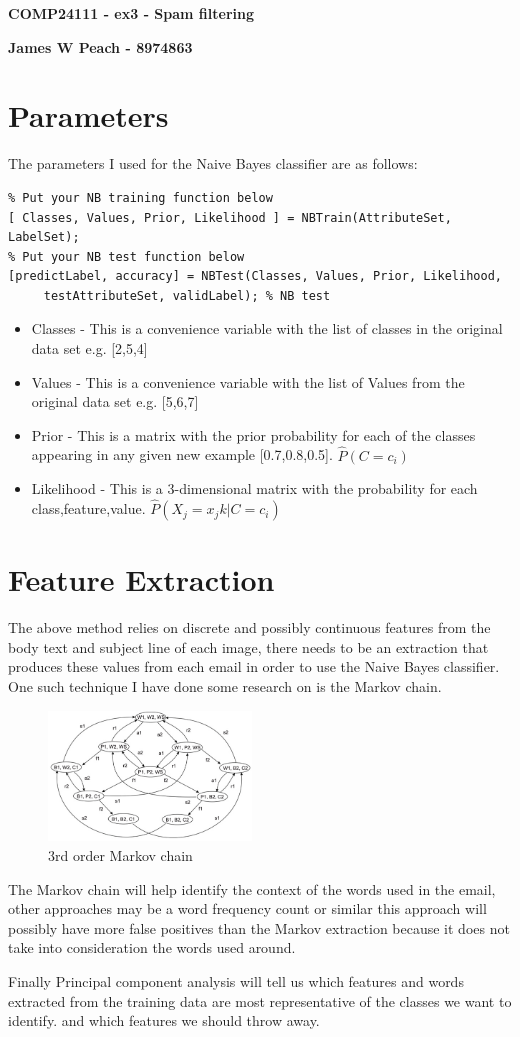 \documentclass[a4paper]{article}
\begin{document}
\textbf{COMP24111 - ex3 - Spam filtering}

\textbf{James W Peach - 8974863}

\section{Parameters}


The parameters I used for the Naive Bayes classifier are as follows:

{\centering\begin{lstlisting}
% Put your NB training function below
[ Classes, Values, Prior, Likelihood ] = NBTrain(AttributeSet, LabelSet);
% Put your NB test function below
[predictLabel, accuracy] = NBTest(Classes, Values, Prior, Likelihood,
	 testAttributeSet, validLabel); % NB test
\end{lstlisting}\par}

\begin{itemize}
\item Classes - This is a convenience variable with the list of classes in the original data set e.g. [2,5,4]
\item Values - This is a convenience variable with the list of Values from the original data set e.g. [5,6,7] 
\item Prior - This is a matrix with the prior probability for each of the classes appearing in any given new example [0.7,0.8,0.5]. $\hat{P}(C=c_i)$
\item Likelihood - This is a 3-dimensional matrix with the probability for each class,feature,value.  $\hat{P}(X_{j} = x_jk | C = c_i)$
\end{itemize}
\section{Feature Extraction}

The above method relies on discrete and possibly continuous features from the body text and subject line of each image, there needs to be an extraction that produces these values from each email in order to use the Naive Bayes classifier.
One such technique I have done some research on is the Markov chain. 
\begin{figure}[h]
\begin{center}
  \includegraphics[width=0.48\textwidth]{order-3-markov.jpg}
  \caption{3rd order Markov chain}
\end{center}
\end{figure}
The Markov chain will help identify the context of the words used in the email, other approaches may be a word frequency count or similar this approach will possibly have more false positives than the Markov extraction because it does not take into consideration the words used around.

Finally Principal component analysis will tell us which features and words extracted from the training data are most representative of the classes we want to identify. and which features we should throw away.
\end{document}
